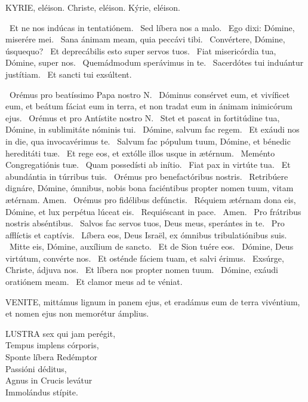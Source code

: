 
KYRIE, eléison. Christe, eléison. Kýrie, eléison.

 \V\ Et ne nos indúcas in tentatiónem. \R\ Sed líbera nos a malo. \V\ Ego dixi: Dómine, miserére mei. \R\ Sana ánimam meam, quia peccávi tibi. \V\ Convértere, Dómine, úsquequo? \R\ Et deprecábilis esto super servos tuos. \V\ Fiat misericórdia tua, Dómine, super nos. \R\ Quemádmodum sperávimus in te. \V\ Sacerdótes tui induántur justítiam. \R\ Et sancti tui exsúltent.

\V\ Orémus pro beatíssimo Papa nostro N. \R\ Dóminus consérvet eum, et vivíficet eum, et beátum fáciat eum in terra, et non tradat eum in ánimam inimicórum ejus. \V\ Orémus et pro Antístite nostro N. \R\ Stet et pascat in fortitúdine tua, Dómine, in sublimitáte nóminis tui. \V\ Dómine, salvum fac regem. \R\ Et exáudi nos in die, qua invocavérimus te. \V\ Salvum fac pópulum tuum, Dómine, et bénedic hereditáti tuæ. \R\ Et rege eos, et extólle illos usque in ætérnum. \V\ Meménto Congregatiónis tuæ. \R\ Quam possedísti ab inítio. \V\ Fiat pax in virtúte tua. \R\ Et abundántia in túrribus tuis. \V\ Orémus pro benefactóribus nostris. \R\ Retribúere dignáre, Dómine, ómnibus, nobis bona faciéntibus propter nomen tuum, vitam ætérnam. Amen. \V\ Orémus pro fidélibus defúnctis. \R\ Réquiem ætérnam dona eis, Dómine, et lux perpétua lúceat eis. \V\ Requiéscant in pace. \R\ Amen. \V\ Pro frátribus nostris abséntibus. \R\ Salvos fac servos tuos, Deus meus, sperántes in te. \V\ Pro afflíctis et captívis. \R\ Líbera eos, Deus Israël, ex ómnibus tribulatiónibus suis. \V\ Mitte eis, Dómine, auxílium de sancto. \R\ Et de Sion tuére eos. \V\ Dómine, Deus virtútum, convérte nos. \R\ Et osténde fáciem tuam, et salvi érimus. \V\ Exsúrge, Christe, ádjuva nos. \R\ Et líbera nos propter nomen tuum. \V\ Dómine, exáudi oratiónem meam. \R\ Et clamor meus ad te véniat.




\lettrine[lines=2]{V}{ENITE}, mittámus lignum in panem ejus, et eradámus eum de terra vivéntium, et nomen ejus non memorétur ámplius.


\lettrine[lines=2]{L}{USTRA} sex qui jam perégit,\\
Tempus implens córporis,\\
Sponte líbera Redémptor\\
Passióni déditus,\\
Agnus in Crucis levátur\\
Immolándus stípite.

